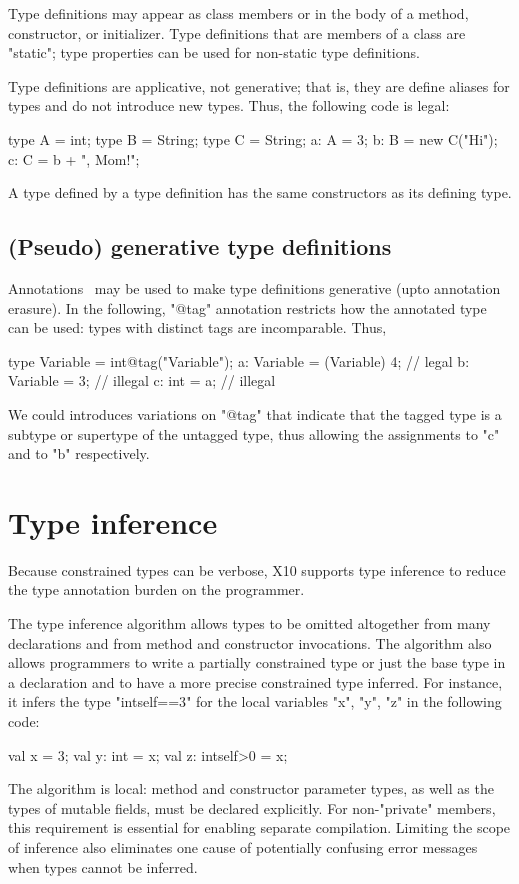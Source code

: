 \documentclass[nocopyrightspace,9pt]{sigplanconf}
\begin{document}
Type definitions may appear as class members or in the body of a
method, constructor, or initializer.  Type definitions that are
members of a class are \xcd"static"; type properties can be used
for non-static type definitions.

Type definitions are applicative, not generative; that is, they
are define aliases for types and do not introduce new types.
Thus, the following code is legal:
\begin{xten}
type A = int;
type B = String;
type C = String;
a: A = 3;
b: B = new C("Hi");
c: C = b + ", Mom!";
\end{xten}
A type defined by a type definition 
has the same constructors as its defining type.

\subsection{(Pseudo) generative type definitions}

Annotations~\cite{ns07-x10anno} may be used to make type definitions
generative (upto annotation erasure).  In the following, \xcd"@tag"
annotation restricts how the annotated type can be used: types
with distinct tags are incomparable.
Thus,
\begin{xten}
type Variable = int@tag("Variable");
a: Variable = (Variable) 4; // legal
b: Variable = 3; // illegal
c: int = a; // illegal
\end{xten}
We could introduces variations on \xcd"@tag" that
indicate that the tagged type is a subtype or supertype of the
untagged type, thus allowing the assignments to \xcd"c"
and to \xcd"b" respectively.

\fi

\fi


\section{Type inference}

Because constrained types can be verbose, X10 supports type
inference to reduce the type annotation burden on the
programmer.

The type inference algorithm allows types to be omitted
altogether from many declarations and from method
and constructor invocations.
The algorithm also allows programmers to write a
partially constrained type or just the base type in a
declaration and to have a more precise constrained type
inferred.
For instance, it infers the type \xcd"int{self==3}" for the
local variables \xcd"x", \xcd"y", \xcd"z" in the following code:
\begin{xten}
val x = 3;
val y: int = x;
val z: int{self>0} = x;
\end{xten}
The algorithm is local: method and constructor parameter types,
as well as the types of mutable fields,
must be declared explicitly.  For non-\xcd"private" members,
this requirement is essential for enabling separate compilation.
Limiting the scope of inference also eliminates one cause of
potentially confusing error messages when types cannot be inferred.
\end{document}
